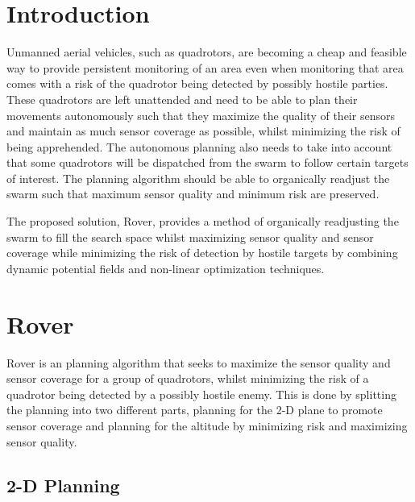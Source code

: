 \documentclass[12pt]{article}
\begin{document}
\maketitle

\newpage



\section{Introduction}

Unmanned aerial vehicles, such as quadrotors, are becoming a cheap and
feasible way to provide persistent monitoring of an area even when monitoring
that area comes with a risk of the quadrotor being detected by possibly
hostile parties. These quadrotors are left unattended and need to be able to
plan their movements autonomously such that they maximize the quality of their
sensors and maintain as much sensor coverage as possible, whilst minimizing the
risk of being apprehended. The autonomous planning also needs to take into
account that some quadrotors will be dispatched from the swarm to follow
certain targets of interest. The planning algorithm should be able to
organically readjust the swarm such that maximum sensor quality and minimum
risk are preserved.

The proposed solution, Rover, provides a method of organically readjusting the
swarm to fill the search space whilst maximizing sensor quality and sensor
coverage while minimizing the risk of detection by hostile targets by combining
dynamic potential fields and non-linear optimization techniques.

\section{Rover}

Rover is an planning algorithm that seeks to maximize the sensor quality and
sensor coverage for a group of quadrotors, whilst minimizing the risk of a
quadrotor being detected by a possibly hostile enemy. This is done by
splitting the planning into two different parts, planning for the 2-D plane to
promote sensor coverage and planning for the altitude by minimizing risk and
maximizing sensor quality.

\subsection{2-D Planning}
\end{document}
